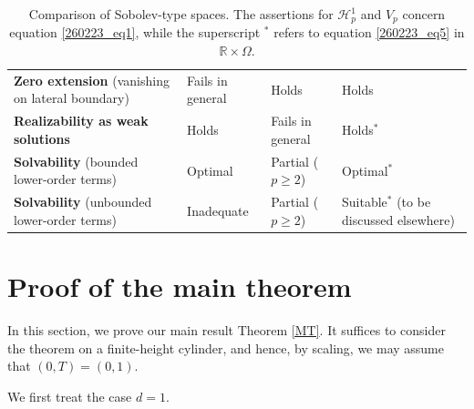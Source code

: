\documentclass[reqno]{amsart}
\numberwithin{equation}{section}
\theoremstyle{plain}
\theoremstyle{definition}
\def\bR{\mathbb{R}}
\def\cH{\mathcal{H}}
\begin{document}
\begin{table}[htbp] 
\centering
\renewcommand{\arraystretch}{1.25}
\begin{tabularx}{\textwidth}{
|>{\arraybackslash}p{4cm}
|>{\arraybackslash}X
|>{\arraybackslash}X
|>{\arraybackslash}X|}
\hline
\multicolumn{1}{|c|}{\textbf{Property}}
& \multicolumn{1}{c|}{$\cH^1_p$}
& \multicolumn{1}{c|}{$V_p$}
& \multicolumn{1}{c|}{$H^{1/2,1}_p$}
\\
\hline

\textbf{Zero extension} \newline (vanishing on lateral boundary)
& Fails in general
& Holds
& Holds
\\
\hline

\textbf{Realizability as weak solutions}
& Holds
& Fails in general
& Holds$^\ast$
\\
\hline

\textbf{Solvability} \newline (bounded lower-order terms)
& Optimal
& Partial ($p \ge 2$)
& Optimal$^\ast$
\\
\hline

\textbf{Solvability} \newline (unbounded lower-order terms)
& Inadequate
& Partial ($p \ge 2$)
& Suitable$^\ast$ (to be discussed elsewhere)
\\
\hline

\end{tabularx}
\caption{
Comparison of Sobolev-type spaces. The assertions for $\cH^1_p$ and $V_p$ concern equation \eqref{260223_eq1}, while the superscript $^\ast$ refers to equation \eqref{260223_eq5} in $\bR\times \Omega$.
}
\label{summary}
\end{table}


\section{Proof of the main theorem}			\label{S2}

In this section, we prove our main result Theorem \ref{MT}.
It suffices to consider the theorem on a finite-height cylinder, and hence, by scaling, we may assume that $(0,T)=(0,1)$.

We first treat the case $d=1$.
\end{document}
